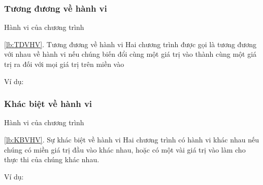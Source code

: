 \subsubsection*{Tương đương về hành vi}
\label{lb:TDVHV}
\begin{frame}{Hành vi của chương trình}
\begin{block}{\ref{lb:TDVHV}. Tương đương về hành vi}
Hai chương trình được gọi là tương đương với nhau về hành vi nếu chúng
biến đổi cùng một giá trị vào thành cùng một giá trị ra đối với mọi
giá trị trên miền vào
\end{block}
\begin{exampleblock}{Ví dụ:}
\begin{minipage}[t]{0.45\linewidth}
	
\end{minipage}%
\hfill\vrule\hfill
\begin{minipage}[t]{0.45\linewidth}
	
\end{minipage}%
\end{exampleblock}
\end{frame}

\subsubsection*{Khác biệt về hành vi}
\label{lb:KBVHV}
\begin{frame}{Hành vi của chương trình}
\begin{block}{\ref{lb:KBVHV}. Sự khác biệt về hành vi}
Hai chương trình có hành vi khác nhau nếu chúng có miền giá trị đầu vào khác nhau, hoặc
có một vài giá trị vào làm cho thực thi của chúng khác nhau.
\end{block}
\begin{exampleblock}{Ví dụ:}
\begin{minipage}[t]{0.45\linewidth}
	
\end{minipage}%
\hfill\vrule\hfill
\begin{minipage}[t]{0.45\linewidth}
	
\end{minipage}%
\end{exampleblock}
\end{frame}

